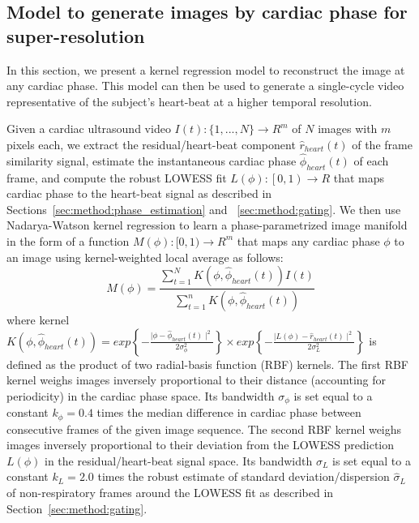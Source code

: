 \documentclass[runningheads,a4paper]{llncs}
\begin{document}
\subsection{Model to generate images by cardiac phase for super-resolution}
\label{sec:method:super_resolution}
%
In this section, we present a kernel regression model to reconstruct the image at any cardiac phase. This model can then be used to generate a single-cycle video representative of the subject's heart-beat at a higher temporal resolution.

Given a cardiac ultrasound video $I(t) : \{1, ..., N\} \to R^m$ of $N$ images with $m$ pixels each, we extract the residual/heart-beat component $\hat{r}_{heart}(t)$ of the frame similarity signal, estimate the instantaneous cardiac phase $\hat{\phi}_{heart}(t)$ of each frame, and compute the robust LOWESS fit $L(\phi) : \left [  0, 1\right ) \to R$ that maps cardiac phase to the heart-beat signal as  described in Sections~\ref{sec:method:phase_estimation} and ~\ref{sec:method:gating}. We then use Nadarya-Watson kernel regression\cite{Bishop2006} to learn a phase-parametrized image manifold in the form of a function $M(\phi): [0, 1) \to R^m $ that maps any cardiac phase $\phi$ to an image using kernel-weighted local average as follows:
\begin{equation}
M(\phi) = \frac{\sum_{t = 1}^{N} K \left( \phi, \hat{\phi}_{heart}(t) \right) I(t)}{\sum_{t = 1}^{n} K \left( \phi, \hat{\phi}_{heart}(t) \right)} 
\end{equation}
where kernel $K\left( \phi, \hat{\phi}_{heart}(t) \right) = exp\left \{ -\frac{ \mid \phi - \hat{\phi}_{heart}(t) \mid^2}{2  \sigma^2_\phi} \right \} \times exp\left \{ -\frac{ \mid L(\phi) - \hat{r}_{heart}(t) \mid^2}{2  \sigma^2_{L}} \right \}$ is defined as the product of two radial-basis function (RBF) kernels. The first RBF kernel  weighs images inversely proportional to their distance (accounting for periodicity) in the cardiac phase space. Its bandwidth $\sigma_\phi$ is set equal to a constant $k_\phi = 0.4$ times the median difference in cardiac phase between consecutive frames of the given image sequence. The second RBF kernel weighs images inversely proportional to their deviation from the LOWESS prediction $L(\phi)$ in the residual/heart-beat signal space. Its bandwidth $\sigma_{L}$ is set equal to a constant $k_L = 2.0$ times the robust estimate of standard deviation/dispersion $\hat{\sigma}_{L}$ of non-respiratory frames around the LOWESS fit as described in Section~\ref{sec:method:gating}.
\end{document}
